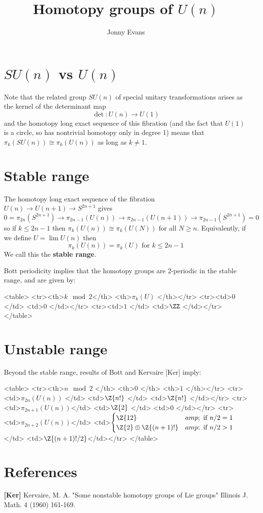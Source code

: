 \documentclass{amsart}
\title{Homotopy groups of $U(n)$}
\author{Jonny Evans}
\begin{document}
\section{$SU(n)$ vs $U(n)$}

Note that the related group $SU(n)$ of special unitary transformations arises as the kernel of the determinant map
\[\det\colon U(n)\to U(1)\]
and the homotopy long exact sequence of this fibration (and the fact that $U(1)$ is a circle, so has nontrivial homotopy only in degree 1) means that $\pi_k(SU(n))\cong\pi_k(U(n))$ as long as $k\neq 1$.

\section{Stable range}

The homotopy long exact sequence of the fibration $U(n)\to U(n+1)\to S^{2n+1}$ gives
\[0=\pi_{2n}(S^{2n+1})\to\pi_{2n-1}(U(n))\to\pi_{2n-1}(U(n+1))\to \pi_{2n-1}(S^{2n+1})=0\]
so if $k\leq 2n-1$ then $\pi_k(U(n))\cong \pi_k(U(N))$ for all $N\geq n$. Equivalently, if we define $U=\lim U(n)$ then
\[\pi_k(U(n)) = \pi_k(U)\mbox{ for }k \leq 2n-1\]
We call this the {\bf stable range}.

Bott periodicity implies that the homotopy groups are 2-periodic in the stable range, and are given by:

      <table>
	<tr><th>$k \mod 2$</th> <th>$\pi_k(U)$ </th></tr>
	<tr><td>$0$       </td> <td>$0$        </td></tr>
	<tr><td>$1$       </td> <td>$\ZZ$      </td></tr>
      </table>

\section{Unstable range}

Beyond the stable range, results of Bott and Kervaire [Ker] imply:
      
      <table>
	<tr><th>$n\mod 2$         </th> <th>$0$                       </th>                                                                  <th>$1$           </th></tr>
	<tr><td>$\pi_{2n}(U(n))$  </td> <td>$\Z{n!}$                  </td>                                                                  <td>$\Z{n!}$      </td></tr>
	<tr><td>$\pi_{2n+1}(U(n))$</td> <td>$\Z{2}$                   </td>                                                                  <td>$0$           </td></tr>
	<tr><td>$\pi_{2n+2}(U(n))$</td> <td>$\begin{cases}\Z{12}&amp;\mbox{ if }n/2=1 \\ \Z{2}\oplus\Z{(n+1)!}&amp;\mbox{ if }n/2>1\end{cases}$</td> <td>$\Z{(n+1)!/2}$</td></tr>
      </table>

\section{References}

{\bf [Ker]} Kervaire, M. A. "Some nonstable homotopy groups of Lie groups" Illinois J. Math. 4 (1960) 161-169.
\end{document}

